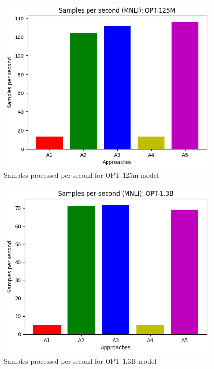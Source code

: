 \documentclass[10pt,twocolumn,letterpaper]{article}
\begin{document}
\begin{figure}[H]
\begin{center}
\includegraphics[width=0.8\linewidth]{figures/samples-opt125m.png}
\end{center}
\caption{Samples processed per second for OPT-125m model}
\end{figure}

\begin{figure}[H]
\begin{center}
\includegraphics[width=0.8\linewidth]{figures/samples-opt1_3B.png}
\end{center}
\caption{Samples processed per second for OPT-1.3B model}
\end{figure}

\end{document}
